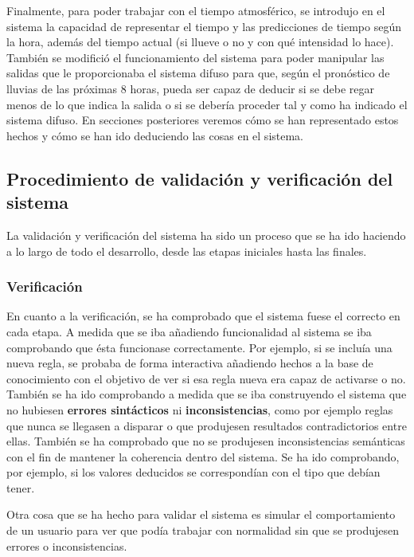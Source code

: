 \documentclass[11pt,a4paper]{article}
\begin{document}
Finalmente, para poder trabajar con el tiempo atmosférico, se introdujo en el sistema la capacidad de representar el tiempo y las
predicciones de tiempo según la hora, además del tiempo actual (si llueve o no y con qué intensidad lo hace). También se modifició
el funcionamiento del sistema para poder manipular las salidas que le proporcionaba el sistema difuso para que, según el pronóstico
de lluvias de las próximas 8 horas, pueda ser capaz de deducir si se debe regar menos de lo que indica la salida o si se debería
proceder tal y como ha indicado el sistema difuso. En secciones posteriores veremos cómo se han representado estos hechos y cómo
se han ido deduciendo las cosas en el sistema.

\subsection{Procedimiento de validación y verificación del sistema}

La validación y verificación del sistema ha sido un proceso que se ha ido haciendo a lo largo de todo el desarrollo, desde las
etapas iniciales hasta las finales.

\subsubsection{Verificación}

En cuanto a la verificación, se ha comprobado que el sistema fuese el correcto en cada etapa. A medida que se iba añadiendo
funcionalidad al sistema se iba comprobando que ésta funcionase correctamente. Por ejemplo, si se incluía una nueva regla, se 
probaba de forma interactiva añadiendo hechos a la base de conocimiento con el objetivo de ver si esa regla nueva era capaz de
activarse o no.
También se ha ido comprobando a medida que se iba construyendo el sistema que no hubiesen \textbf{errores sintácticos} ni
\textbf{inconsistencias}, como por ejemplo reglas que nunca se llegasen a disparar o que produjesen resultados contradictorios
entre ellas. También se ha comprobado que no se produjesen inconsistencias semánticas con el fin de mantener la coherencia
dentro del sistema. Se ha ido comprobando, por ejemplo, si los valores deducidos se correspondían con el tipo que debían tener.

Otra cosa que se ha hecho para validar el sistema es simular el comportamiento de un usuario para ver que podía trabajar con
normalidad sin que se produjesen errores o inconsistencias.
\end{document}
